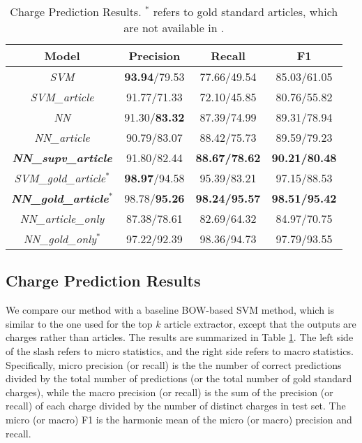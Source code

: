 \begin{table}
\centering
\small{
\begin{tabular}{|c|c|c|c|}
\hline
\textbf{Model}				& \textbf{Precision} 	& \textbf{Recall} 		& \textbf{F1} 	\\
\hline
\textit{SVM} 				& \textbf{93.94}/79.53					& 77.66/49.54  					& 85.03/61.05 				 	\\
\hline
\textit{SVM\_article} 			& 91.77/71.33					& 72.10/45.85  					& 80.76/55.82				 	\\
\hline
\textit{NN}				& 91.30/\textbf{83.32}			& 87.39/74.99  					& 89.31/78.94					\\
\hline
\textit{NN\_article}			& 90.79/83.07					& 88.42/75.73  					& 89.59/79.23					\\
\hline
\textbf{\textit{NN\_supv\_article}} 	& 91.80/82.44 					& \textbf{88.67/78.62} 			& \textbf{90.21/80.48} 		 	\\
\hline
\hline
\textit{SVM\_gold\_article$^*$} 	& \textbf{98.97}/94.58			& 95.39/83.21  					& 97.15/88.53					\\
\hline
\textbf{\textit{NN\_gold\_article$^*$}} 		& 98.78/\textbf{95.26} 			& \textbf{98.24/95.57} 			& \textbf{98.51/95.42} 			\\
\hline
\hline
\textit{NN\_article\_only} 			& 87.38/78.61				& 82.69/64.32				& 84.97/70.75		\\
\hline
\textit{NN\_gold\_only$^*$} 		& 97.22/92.39				& 98.36/94.73				& 97.79/93.55		\\
\hline
\end{tabular}
}
\caption{Charge Prediction Results. $^*$ refers to gold standard articles, which are not available in .}
\label{tabble_main_results}
\end{table}


\subsection{Charge Prediction Results}
\label{sec_main_results}
We compare our method with a baseline BOW-based SVM method, which is similar to the one used for the top $k$ article extractor, except that the outputs are charges rather than articles. The results are summarized in Table \ref{tabble_main_results}. The left side of the slash refers to micro statistics, and the right side refers to macro statistics. Specifically, micro precision (or recall) is the the number of correct predictions divided by the total number of predictions (or the total number of gold standard charges), while the macro precision (or recall) is the sum of the precision (or recall) of each charge divided by the number of distinct charges in test set. The micro (or macro) F1 is the harmonic mean of the micro (or macro) precision and recall.


